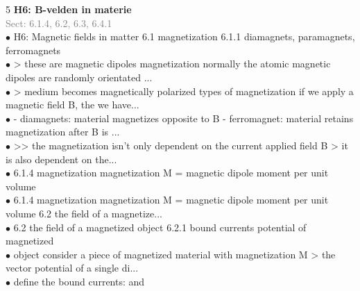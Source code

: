 \documentclass[7pt,a4paper]{article}
\begin{document}
\begin{multicols*}{5}
\textbf{H6: B-velden in materie}\\\textcolor{gray}{{Sect: 6.1.4, 6.2, 6.3, 6.4.1}}\\\vspace{0.5pt}
$\bullet$ H6: Magnetic fields in matter
6.1 magnetization
6.1.1 diamagnets, paramagnets, ferromagnets\\
$\bullet$ > these are magnetic dipoles
magnetization normally the atomic magnetic dipoles are randomly orientated
...\\
$\bullet$ > medium becomes magnetically polarized
types of magnetization if we apply a magnetic field B, the we have...\\
$\bullet$ - diamagnets: material magnetizes opposite to B
 - ferromagnet: material retains magnetization after B is ...\\
$\bullet$ >> the magnetization isn't only dependent on the current applied field B
    > it is also dependent on the...\\
$\bullet$ 6.1.4 magnetization
magnetization M = magnetic dipole moment per unit volume\\
$\bullet$ 6.1.4 magnetization
magnetization M = magnetic dipole moment per unit volume
6.2 the field of a magnetize...\\
$\bullet$ 6.2 the field of a magnetized object
6.2.1 bound currents
potential of magnetized\\
$\bullet$ object
consider a piece of magnetized material with magnetization M
> the vector potential of a single di...\\
$\bullet$ define the bound currents:
    and\\
\columnbreak


\end{multicols*}

\newpage
\end{document}
